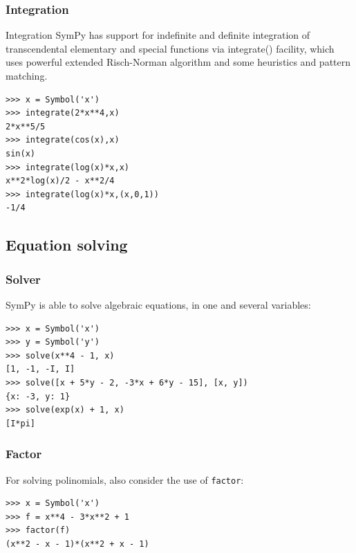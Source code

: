 \documentclass[10pt,colorlinks]{beamer}
\begin{document}
\begin{frame}[fragile]\frametitle{Integration}
\begin{block}{Integration}
SymPy has support for indefinite and definite integration of transcendental elementary and special functions via integrate() facility, which uses powerful extended Risch-Norman algorithm and some heuristics and pattern matching.
\end{block}
\begin{verbatim}
>>> x = Symbol('x')
>>> integrate(2*x**4,x)
2*x**5/5
>>> integrate(cos(x),x)
sin(x)
>>> integrate(log(x)*x,x)
x**2*log(x)/2 - x**2/4
>>> integrate(log(x)*x,(x,0,1))
-1/4
\end{verbatim}

\end{frame}



\subsection{Equation solving} %
\label{sub:Equation solving}
\begin{frame}[fragile]\frametitle{Solver}

SymPy is able to solve algebraic equations, in one and several variables:
\begin{verbatim}
>>> x = Symbol('x')
>>> y = Symbol('y')
>>> solve(x**4 - 1, x)
[1, -1, -I, I]
>>> solve([x + 5*y - 2, -3*x + 6*y - 15], [x, y])
{x: -3, y: 1}
>>> solve(exp(x) + 1, x)
[I*pi]
\end{verbatim}


\end{frame}

\begin{frame}[fragile]\frametitle{Factor}
For solving polinomials, also consider the use of \verb|factor|:
\begin{verbatim}
>>> x = Symbol('x')
>>> f = x**4 - 3*x**2 + 1
>>> factor(f)
(x**2 - x - 1)*(x**2 + x - 1)
\end{verbatim}

\end{frame}
\end{document}

